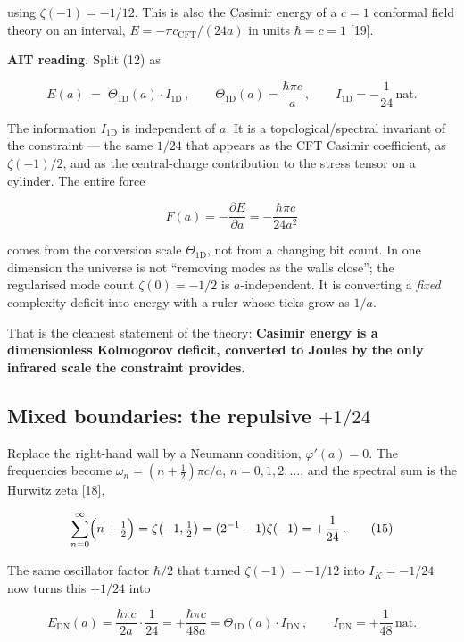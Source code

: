 \documentclass[11pt,letterpaper]{article}
\begin{document}
using \(\zeta(-1)=-1/12\). This is also the Casimir energy of a \(c=1\) conformal field theory on an interval, \(E=-\pi c_{\mathrm{CFT}}/(24a)\) in units \(\hbar=c=1\) [19].


\textbf{AIT reading.} Split (12) as


\[
E(a)\;=\;\Theta_{1\mathrm{D}}(a)\cdot I_{1\mathrm{D}}\,,
\qquad
\Theta_{1\mathrm{D}}(a)=\frac{\hbar\pi c}{a}\,,
\qquad
I_{1\mathrm{D}}=-\frac{1}{24}\,\text{nat}.
\tag{13}
\]


The information \(I_{1\mathrm{D}}\) is independent of \(a\). It is a topological/spectral invariant of the constraint — the same \(1/24\) that appears as the CFT Casimir coefficient, as \(\zeta(-1)/2\), and as the central-charge contribution to the stress tensor on a cylinder. The entire force


\[
F(a)=-\frac{\partial E}{\partial a}=-\frac{\hbar\pi c}{24a^{2}}
\tag{14}
\]


comes from the conversion scale \(\Theta_{1\mathrm{D}}\), not from a changing bit count. In one dimension the universe is not “removing modes as the walls close”; the regularised mode count \(\zeta(0)=-1/2\) is \(a\)-independent. It is converting a \emph{fixed} complexity deficit into energy with a ruler whose ticks grow as \(1/a\).


That is the cleanest statement of the theory: \textbf{Casimir energy is a dimensionless Kolmogorov deficit, converted to Joules by the only infrared scale the constraint provides.}


\subsection{\texorpdfstring{Mixed boundaries: the repulsive \(+1/24\)}{Mixed boundaries: the repulsive +1/24}}


Replace the right-hand wall by a Neumann condition, \(\varphi'(a)=0\). The frequencies become \(\omega_n=(n+\tfrac12)\pi c/a\), \(n=0,1,2,\ldots\), and the spectral sum is the Hurwitz zeta [18],


\[
\sum_{n=0}^{\infty}\Bigl(n+\tfrac12\Bigr)
=\zeta\bigl(-1,\tfrac12\bigr)
=(2^{-1}-1)\zeta(-1)
=+\frac{1}{24}\,.
\tag{15}
\]


The same oscillator factor \(\hbar/2\) that turned \(\zeta(-1)=-1/12\) into \(I_K=-1/24\) now turns this \(+1/24\) into


\[
E_{\mathrm{DN}}(a)
=\frac{\hbar\pi c}{2a}\cdot\frac{1}{24}
=+\frac{\hbar\pi c}{48a}
=\Theta_{1\mathrm{D}}(a)\cdot I_{\mathrm{DN}}\,,
\qquad
I_{\mathrm{DN}}=+\frac{1}{48}\,\text{nat}.
\tag{16}
\]
\end{document}

